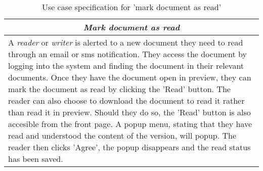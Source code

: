 \begin{table}[H]
\centering
\begin{tabular}{p{14.5cm}}
\hline
\multicolumn{1}{c}{\textit{\textbf{Mark document as read}}} \\
\hline
A \textit{reader} or \textit{writer} is alerted to a new document they need to read through an email or sms notification.
They access the document by logging into the system and finding the document in their relevant documents.
Once they have the document open in preview, they can mark the document as read by clicking the 'Read' button.
The reader can also choose to download the document to read it rather than read it in preview.
Should they do so, the 'Read' button is also accesible from the front page.
A popup menu, stating that they have read and understood the content of the version, will popup.
The reader then clicks 'Agree', the popup disappears and the read status has been saved.
\\\hline
\end{tabular}
\caption{Use case specification for 'mark document as read'}\label{tab:mark-read}
\end{table}
